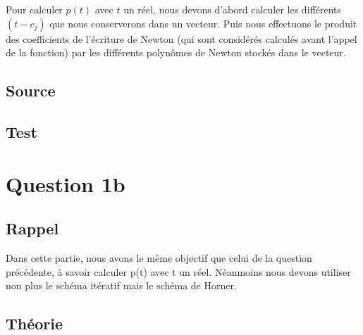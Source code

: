 \documentclass[a4paper,10pt]{report}
\begin{document}
Pour calculer $p(t)$ avec $t$ un réel, nous devons d’abord calculer les différents $(t-c_{j})$ que nous conserverons dans un vecteur. Puis nous effectuons le produit des coefficients de l’écriture de Newton (qui sont considérés calculés avant l’appel de la fonction) par les différents polynômes de Newton stockés dans le vecteur.

\subsection*{Source}

\begin{center}
	
\end{center}

\begin{center}
	
\end{center}

\subsection*{Test}

\begin{center}
	
\end{center}

\section*{Question 1b}

\subsection*{Rappel}

Dans cette partie, nous avons le même objectif que celui de la question précédente, à savoir calculer p(t) avec t un réel. Néanmoins nous devons utiliser non plus le schéma itératif mais le schéma de Horner. 

\subsection*{Théorie}
\end{document}
